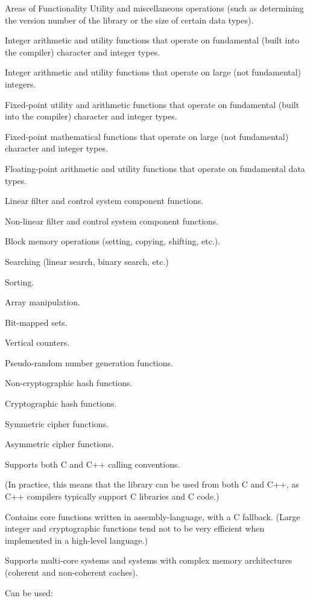 Areas of Functionality
Utility and miscellaneous operations (such as determining the version number
of the library or the size of certain data types).

Integer arithmetic and utility functions that operate on fundamental
(built into the compiler) character and integer types.

Integer arithmetic and utility functions that operate on large
(not fundamental) integers.

Fixed-point utility and arithmetic functions that operate on fundamental
(built into the compiler) character and integer types.

Fixed-point mathematical functions that operate on large (not
fundamental) character and integer types.

Floating-point arithmetic and utility functions that operate on fundamental data types.

Linear filter and control system component functions.

Non-linear filter and control system component functions.

Block memory operations (setting, copying, shifting, etc.).

Searching (linear search, binary search, etc.)

Sorting.

Array manipulation.

Bit-mapped sets.

Vertical counters.

Pseudo-random number generation functions.

Non-cryptographic hash functions.

Cryptographic hash functions.

Symmetric cipher functions.

Asymmetric cipher functions.

Supports both C and C++ calling conventions.

(In practice, this means that the library can be used from both C and C++,
as C++ compilers typically support C libraries and C code.)

Contains core functions written in assembly-language, with a C fallback.
(Large integer and cryptographic functions tend not to be very efficient
when implemented in a high-level language.)

Supports multi-core systems and systems with complex memory
architectures (coherent and non-coherent caches).

Can be used:

